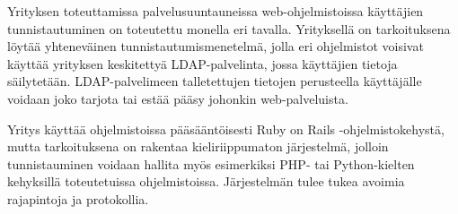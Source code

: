 Yrityksen toteuttamissa palvelusuuntauneissa web-ohjelmistoissa käyttäjien tunnistautuminen on toteutettu monella eri tavalla. Yrityksellä on tarkoituksena löytää yhteneväinen tunnistautumismenetelmä, jolla eri ohjelmistot voisivat käyttää yrityksen keskitettyä LDAP-palvelinta, jossa käyttäjien tietoja säilytetään. LDAP-palvelimeen talletettujen tietojen perusteella käyttäjälle voidaan joko tarjota tai estää pääsy johonkin web-palveluista.

Yritys käyttää ohjelmistoissa pääsääntöisesti Ruby on Rails -ohjelmistokehystä, mutta tarkoituksena on rakentaa kieliriippumaton järjestelmä, jolloin tunnistauminen voidaan hallita myös esimerkiksi PHP- tai Python-kielten kehyksillä toteutetuissa ohjelmistoissa. Järjestelmän tulee tukea avoimia rajapintoja ja protokollia.
